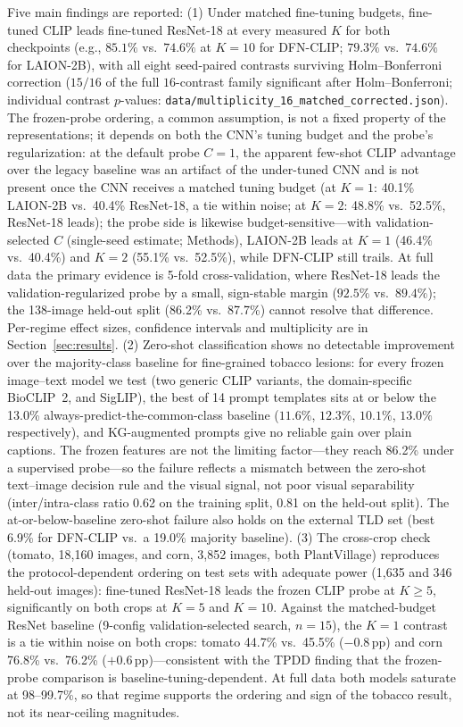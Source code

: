 \documentclass[10pt,a4paper]{article}
\begin{document}
Five main findings are reported:
(1) Under matched fine-tuning budgets, fine-tuned CLIP leads fine-tuned ResNet-18 at every measured $K$ for both checkpoints (e.g., $85.1\%$ vs.\ $74.6\%$ at $K{=}10$ for DFN-CLIP; $79.3\%$ vs.\ $74.6\%$ for LAION-2B), with all eight seed-paired contrasts surviving Holm--Bonferroni correction ($15/16$ of the full $16$-contrast family significant after Holm--Bonferroni; individual contrast $p$-values: \texttt{data/multiplicity\_16\_matched\_corrected.json}). The frozen-probe ordering, a common assumption, is not a fixed property of the representations; it depends on both the CNN's tuning budget and the probe's regularization: at the default probe $C{=}1$, the apparent few-shot CLIP advantage over the legacy baseline was an artifact of the under-tuned CNN and is not present once the CNN receives a matched tuning budget (at $K{=}1$: 40.1\% LAION-2B vs.\ 40.4\% ResNet-18, a tie within noise; at $K{=}2$: 48.8\% vs.\ 52.5\%, ResNet-18 leads); the probe side is likewise budget-sensitive---with validation-selected $C$ (single-seed estimate; Methods), LAION-2B leads at $K{=}1$ (46.4\% vs.\ 40.4\%) and $K{=}2$ (55.1\% vs.\ 52.5\%), while DFN-CLIP still trails. At full data the primary evidence is 5-fold cross-validation, where ResNet-18 leads the validation-regularized probe by a small, sign-stable margin ($92.5\%$ vs.\ $89.4\%$); the 138-image held-out split (86.2\% vs.\ 87.7\%) cannot resolve that difference. Per-regime effect sizes, confidence intervals and multiplicity are in Section~\ref{sec:results}.
(2) Zero-shot classification shows no detectable improvement over the majority-class baseline for fine-grained tobacco lesions: for every frozen image--text model we test (two generic CLIP variants, the domain-specific BioCLIP~2, and SigLIP), the best of 14 prompt templates sits at or below the 13.0\% always-predict-the-common-class baseline ($11.6\%$, $12.3\%$, $10.1\%$, $13.0\%$ respectively), and KG-augmented prompts give no reliable gain over plain captions. The frozen features are not the limiting factor---they reach 86.2\% under a supervised probe---so the failure reflects a mismatch between the zero-shot text--image decision rule and the visual signal, not poor visual separability (inter/intra-class ratio 0.62 on the training split, 0.81 on the held-out split). The at-or-below-baseline zero-shot failure also holds on the external TLD set (best 6.9\% for DFN-CLIP vs.\ a 19.0\% majority baseline).
(3) The cross-crop check (tomato, 18{,}160 images, and corn, 3{,}852 images, both PlantVillage) reproduces the protocol-dependent ordering on test sets with adequate power (1{,}635 and 346 held-out images): fine-tuned ResNet-18 leads the frozen CLIP probe at $K{\geq}5$, significantly on both crops at $K{=}5$ and $K{=}10$. Against the matched-budget ResNet baseline (9-config validation-selected search, $n{=}15$), the $K{=}1$ contrast is a tie within noise on both crops: tomato 44.7\% vs.\ 45.5\% ($-0.8$\,pp) and corn 76.8\% vs.\ 76.2\% ($+0.6$\,pp)---consistent with the TPDD finding that the frozen-probe comparison is baseline-tuning-dependent. At full data both models saturate at 98--99.7\%, so that regime supports the ordering and sign of the tobacco result, not its near-ceiling magnitudes.
\end{document}
